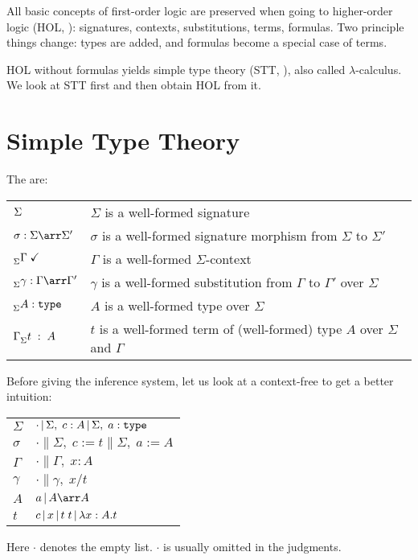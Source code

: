 All basic concepts of first-order logic are preserved when going to higher-order logic (HOL, \cite{}): signatures, contexts, substitutions, terms, formulas. Two principle things change: types are added, and formulas become a special case of terms.

HOL without formulas yields simple type theory (STT, \cite{churchtypes}), also called $\lambda$-calculus. We look at STT first and then obtain HOL from it.

\section{Simple Type Theory}

The  are:
\begin{center}
	\begin{tabular}{|l|l|}
	  \hline
	  $^{} \Sigma$   & $\Sigma$ is a well-formed signature \\
	  $\ismorph{\Sigma}{\Sigma'}{\sigma}$   & $\sigma$ is a well-formed signature morphism from $\Sigma$ to $\Sigma'$\\
	  $^{}_{\Sigma}\Gamma\;\checkmark$  & $\Gamma$ is a well-formed $\Sigma$-context \\
	  $\issubs{\Sigma}{\Gamma}{\Gamma'}{\gamma}$  & $\gamma$ is a well-formed substitution from $\Gamma$ to $\Gamma'$ over $\Sigma$ \\
		$^{}_{\Sigma}A:\mathtt{type}$ & $A$ is a well-formed type over $\Sigma$ \\
		$\Gamma^{}_{\Sigma}t\;:\;A$ & $t$ is a well-formed term of (well-formed) type $A$ over $\Sigma$ and $\Gamma$ \\
		\hline
	\end{tabular}
\end{center}

Before giving the inference system, let us look at a context-free  to get a better intuition:
\begin{center}
	\begin{tabular}{l@{\tb::=\tb}l}
		$\Sigma$ & $\cdot \,|\, \Sigma,\;c:A \,|\, \Sigma,\;a:\mathtt{type}$ \\
		$\sigma$ & $\cdot \| \Sigma,\;c:=t \| \Sigma,\;a:=A$ \\
		$\Gamma$ & $\cdot \| \Gamma,\;x:A$ \\
		$\gamma$ & $\cdot \| \gamma,\;x/t$ \\
		$A$      & $a     \| A \arr A$ \\
		$t$      & $c     \,|\, x \,|\, t\;t \,|\, \lambda x:A.t$ \\
	\end{tabular}
\end{center}
Here $\cdot$ denotes the empty list. $\cdot$ is usually omitted in the judgments.

